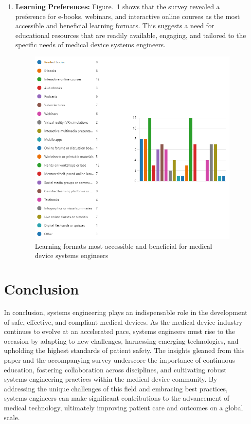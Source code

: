 \documentclass[conference]{IEEEtran}
\begin{document}
\begin{enumerate}
        \item \textbf{Learning Preferences:} Figure.~\ref{fig_learning_preferences} shows that the survey revealed a 
        preference for e-books, webinars, and interactive online courses 
        as the most accessible and beneficial learning formats. This suggests 
        a need for educational resources that are readily available, 
        engaging, and tailored to the specific needs of medical device 
        systems engineers.

        \begin{figure}[htbp]
            \centerline{\includegraphics[width=\linewidth]{../report/_book/images/paste-41.png}}
            \caption{Learning formats most accessible and beneficial for medical device systems engineers}
            \label{fig_learning_preferences}
        \end{figure}

    \end{enumerate}

\section{Conclusion}

    In conclusion, systems engineering plays an indispensable role in 
    the development of safe, effective, and compliant medical devices. 
    As the medical device industry continues to evolve at an 
    accelerated pace, systems engineers must rise to the occasion by 
    adapting to new challenges, harnessing emerging technologies, and 
    upholding the highest standards of patient safety. The insights 
    gleaned from this paper and the accompanying survey underscore the 
    importance of continuous education, fostering collaboration across 
    disciplines, and cultivating robust systems engineering practices 
    within the medical device community. By addressing the unique 
    challenges of this field and embracing best practices, systems 
    engineers can make significant contributions to the advancement of 
    medical technology, ultimately improving patient care and outcomes 
    on a global scale.
\end{document}
